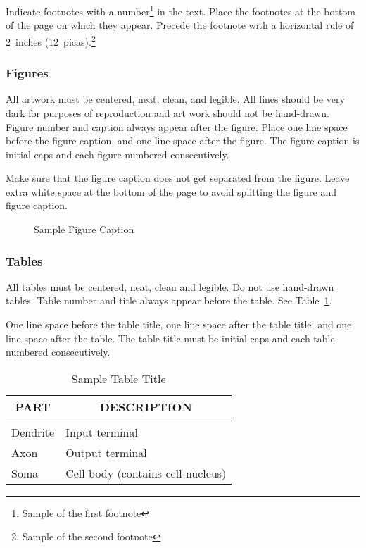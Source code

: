 \documentclass{article} %
\begin{document}
Indicate footnotes with a number\footnote{Sample of the first
footnote} in the text. Place the footnotes at the bottom of the
page on which they appear. Precede the footnote with a horizontal
rule of 2~inches (12~picas).\footnote{Sample of the second
footnote} 

\subsubsection{Figures} 

All artwork must be centered, neat, clean, and legible.  All lines
should be very dark for purposes of reproduction and art work
should not be hand-drawn.  Figure number and caption always appear
after the figure.  Place one line space before the figure caption,
and one line space after the figure. The figure caption is initial
caps and each figure numbered consecutively.

Make sure that the figure caption does not get separated from the
figure. Leave extra white space at the bottom of the page to avoid
splitting the figure and figure caption.
\begin{figure}[h]
\vspace{1in}
\caption{Sample Figure Caption}
\end{figure}

\subsubsection{Tables}

All tables must be centered, neat, clean and legible. Do not use
hand-drawn tables. Table number and title always appear before the
table.
See Table~\ref{sample-table}.

One line space before the table title, one line space after the
table title, and one line space after the table. The table title
must be initial caps and each table numbered consecutively.

\begin{table}[t]
\caption{Sample Table Title}
\label{sample-table}
\begin{center}
\begin{tabular}{ll}
\multicolumn{1}{c}{\bf PART}  &\multicolumn{1}{c}{\bf DESCRIPTION}
\\ \hline \\
Dendrite         &Input terminal \\
Axon             &Output terminal \\
Soma             &Cell body (contains cell nucleus) \\
\end{tabular}
\end{center}
\end{table}
\end{document}
